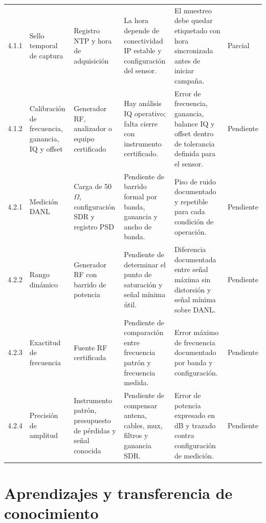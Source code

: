 \begin{longtable}{@{}p{1.15cm} p{2.35cm} p{2.45cm} p{2.45cm} p{2.9cm} p{1.8cm}@{}}
4.1.1 & Sello temporal de captura & Registro NTP y hora de adquisición & La hora depende de conectividad IP estable y configuración del sensor. & El muestreo debe quedar etiquetado con hora sincronizada antes de iniciar campaña. & Parcial \\
4.1.2 & Calibración de frecuencia, ganancia, IQ y offset & Generador RF, analizador o equipo certificado & Hay análisis IQ operativo; falta cierre con instrumento certificado. & Error de frecuencia, ganancia, balance IQ y offset dentro de tolerancia definida para el sensor. & Pendiente \\
4.2.1 & Medición DANL & Carga de 50~$\Omega$, configuración SDR y registro PSD & Pendiente de barrido formal por banda, ganancia y ancho de banda. & Piso de ruido documentado y repetible para cada condición de operación. & Pendiente \\
4.2.2 & Rango dinámico & Generador RF con barrido de potencia & Pendiente de determinar el punto de saturación y señal mínima útil. & Diferencia documentada entre señal máxima sin distorsión y señal mínima sobre DANL. & Pendiente \\
4.2.3 & Exactitud de frecuencia & Fuente RF certificada & Pendiente de comparación entre frecuencia patrón y frecuencia medida. & Error máximo de frecuencia documentado por banda y configuración. & Pendiente \\
4.2.4 & Precisión de amplitud & Instrumento patrón, presupuesto de pérdidas y señal conocida & Pendiente de compensar antena, cables, mux, filtros y ganancia SDR. & Error de potencia expresado en dB y trazado contra configuración de medición. & Pendiente \\
\bottomrule
\end{longtable}
\setlength{\tabcolsep}{6pt}
\normalsize

\section{Aprendizajes y transferencia de conocimiento}

